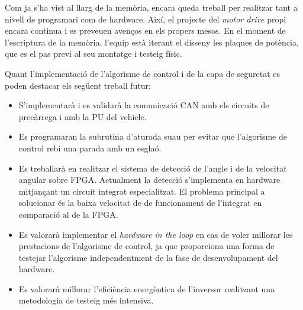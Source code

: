 Com ja s'ha vist al llarg de la memòria, encara queda treball per realitzar
tant a nivell de programari com de hardware. Així, el projecte del \emph{motor
drive} propi encara continua i es preveuen avenços en els propers mesos. En el
moment de l'escriptura de la memòria, l'equip està iterant el disseny les
plaques de potència, que es el pas previ al seu montatge i testeig físic. 

Quant l'implementació de l'algorisme de control i de la capa de seguretat es
poden destacar els següent treball futur:

\begin{itemize}
    \item 
        S'implementarà i es validarà la comunicació CAN amb els circuits de
        precàrrega i amb la PU del vehicle.
    \item
        Es programaran la subrutina d'aturada suau per evitar que l'algorisme
        de control rebi una parada amb un esglaó.
    \item
        Es treballarà en realitzar el sistema de detecció de l'angle i de la
        velocitat angular sobre FPGA. Actualment la detecció s'implementa en
        hardware mitjançant un circuit integrat especialitzat. El problema
        principal a solucionar és la baixa velocitat de de funcionament de
        l'integrat en comparació al de la FPGA.
    \item 
        Es valorarà implementar el \emph{hardware in the loop} en cas de voler
        millorar les prestacions de l'algorisme de control, ja que proporciona
        una forma de testejar l'algorisme independentment de la fase de
        desenvolupament del hardware.
    \item
        Es valorarà millorar l'eficiència energèntica de l'inversor realitzant
        una metodologia de testeig més intensiva.
\end{itemize}
